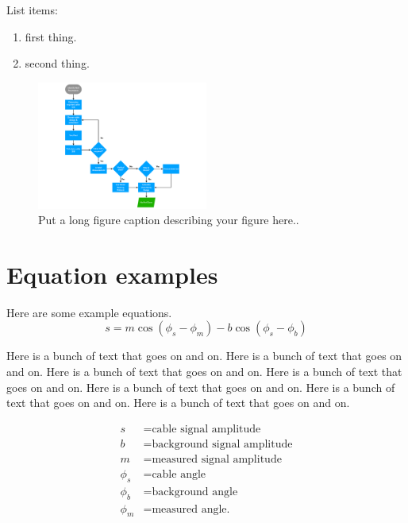 \documentclass[paper=a4, fontsize=11pt abstract]{scrartcl}
\numberwithin{equation}{section}		%
\numberwithin{figure}{section}			%
\numberwithin{table}{section}				%
\begin{document}
List items:
\begin{enumerate}
    \item first thing.
    \item second thing.
\end{enumerate}

\begin{figure}[h!]
    \caption{Put a long figure caption describing your figure here..}
    \label{fig:yourFigureLabel}
    \centering
    \includegraphics[width=0.5\textwidth]{figures/flow_chart_v2.pdf}
\end{figure}




\section{Equation examples}\label{section:examples}
Here are some example equations.
\begin{equation}
    s = m \cos\left(\phi_s-\phi_m\right) - b\cos\left( \phi_s-\phi_b\right)
\end{equation}

Here is a bunch of text that goes on and on.
Here is a bunch of text that goes on and on.
Here is a bunch of text that goes on and on.
Here is a bunch of text that goes on and on.
Here is a bunch of text that goes on and on.
Here is a bunch of text that goes on and on.
Here is a bunch of text that goes on and on.

\begin{align*}
    s &= \text{cable signal amplitude}\\
    b &= \text{background signal amplitude}\\
    m &= \text{measured signal amplitude}\\
    \phi_s &= \text{cable angle}\\
    \phi_b &= \text{background angle}\\
    \phi_m &= \text{measured angle.}\\
\end{align*}
\end{document}
